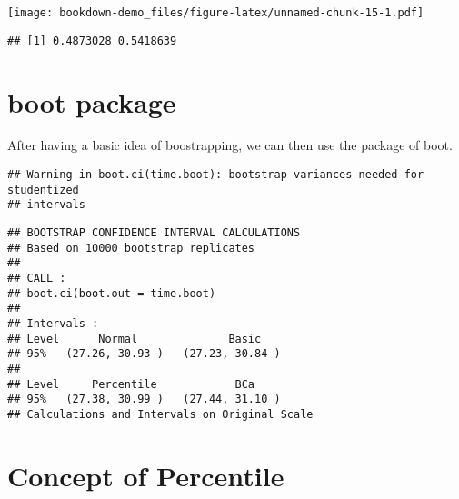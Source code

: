 \documentclass[]{book}
\newenvironment{Shaded}{\begin{snugshade}}{\end{snugshade}}
\newcommand{\ControlFlowTok}[1]{\textcolor[rgb]{0.13,0.29,0.53}{\textbf{#1}}}
\newcommand{\DecValTok}[1]{\textcolor[rgb]{0.00,0.00,0.81}{#1}}
\newcommand{\KeywordTok}[1]{\textcolor[rgb]{0.13,0.29,0.53}{\textbf{#1}}}
\newcommand{\NormalTok}[1]{#1}
\newcommand{\OperatorTok}[1]{\textcolor[rgb]{0.81,0.36,0.00}{\textbf{#1}}}
\newcommand{\StringTok}[1]{\textcolor[rgb]{0.31,0.60,0.02}{#1}}
\begin{document}
\texttt{[image: bookdown-demo\_files/figure-latex/unnamed-chunk-15-1.pdf]}

\begin{verbatim}
## [1] 0.4873028 0.5418639
\end{verbatim}

\hypertarget{boot-package}{%
\section{boot package}\label{boot-package}}

After having a basic idea of boostrapping, we can then use the package of boot.

\begin{Shaded}
\end{Shaded}

\begin{verbatim}
## Warning in boot.ci(time.boot): bootstrap variances needed for studentized
## intervals
\end{verbatim}

\begin{verbatim}
## BOOTSTRAP CONFIDENCE INTERVAL CALCULATIONS
## Based on 10000 bootstrap replicates
## 
## CALL : 
## boot.ci(boot.out = time.boot)
## 
## Intervals : 
## Level      Normal              Basic         
## 95%   (27.26, 30.93 )   (27.23, 30.84 )  
## 
## Level     Percentile            BCa          
## 95%   (27.38, 30.99 )   (27.44, 31.10 )  
## Calculations and Intervals on Original Scale
\end{verbatim}

\hypertarget{concept-of-percentile}{%
\section{Concept of Percentile}\label{concept-of-percentile}}
\end{document}

